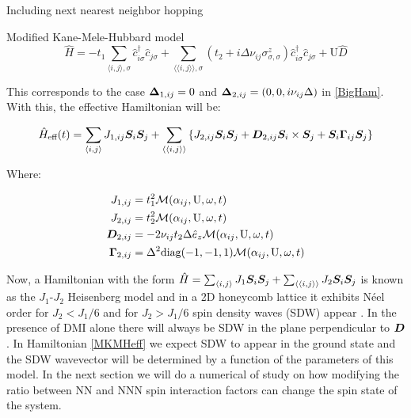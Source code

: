 \begin{section}{Including next nearest neighbor hopping}
\begin{subsection}{Modified Kane-Mele-Hubbard model}
\begin{equation}
\label{MKMH}
\hat{H} = - t_1\sum_{\langle i,j \rangle, \sigma} \hat{c}_{i \sigma}^\dagger \hat{c}_{j \sigma} + 
	\sum_{\langle \langle i,j \rangle \rangle, \sigma}(t_2 + i\Delta\nu_{ij}\sigma^z_{\sigma, \sigma})\hat{c}_{i \sigma}^\dagger \hat{c}_{j \sigma} + 
	\text{U}\hat{D}
\end{equation}

This corresponds to the case $\boldsymbol{\Delta}_{1,ij} = 0$ and $\boldsymbol{\Delta}_{2,ij} = (0, 0, i \nu_{ij} \Delta)$ in \ref{BigHam}. With this, the effective Hamiltonian will be:

\begin{equation}
\label{MKMHeff}
\hat{H}_{\text{eff}}(t) = \sum_{\langle i,j \rangle} J_{1,ij}\boldsymbol{S}_i\boldsymbol{S}_j + \sum_{\langle \langle i,j \rangle \rangle} \left\{ J_{2,ij}\boldsymbol{S}_i\boldsymbol{S}_j + \boldsymbol{D}_{2,ij} \boldsymbol{S}_i \times \boldsymbol{S}_j + \boldsymbol{S}_i \boldsymbol{\Gamma}_{ij} \boldsymbol{S}_j \right\}
\end{equation}

Where:

\begin{align*}
J_{1,ij} &= t_1^2\mathcal{M}(\alpha_{ij}, \text{U}, \omega, t) \\
J_{2,ij} &= t_2^2\mathcal{M}(\alpha_{ij}, \text{U}, \omega, t) \\
\boldsymbol{D}_{2,ij} &= - 2\nu_{ij} t_2 \Delta \hat{e}_z \mathcal{M}(\alpha_{ij}, \text{U}, \omega, t) \\
\boldsymbol{\Gamma}_{2,ij} &= \Delta^2 \text{diag}(-1,-1,1) \mathcal{M}(\alpha_{ij}, \text{U}, \omega, t) 
\end{align*}

Now, a Hamiltonian with the form $\hat{H} = \sum_{\langle i,j \rangle} J_1 \boldsymbol{S}_i\boldsymbol{S}_j + \sum_{\langle \langle i,j \rangle \rangle} J_2\boldsymbol{S}_i\boldsymbol{S}_j$ is known as the $J_1$-$J_2$ Heisenberg model and in a 2D honeycomb lattice it exhibits N\'eel order for $J_2 < J_1 / 6$ and for $J_2 > J_1 / 6$ spin density waves (SDW) appear \cite{Mulder2010}. In the presence of DMI alone there will always be SDW in the plane perpendicular to $\boldsymbol{D}$ \cite{Uchida2006}. In Hamiltonian \ref{MKMHeff} we expect SDW to appear in the ground state and the SDW wavevector will be determined by a function of the parameters of this model. In the next section we will do a numerical of study on how modifying the ratio between NN and NNN spin interaction factors can change the spin state of the system.

\end{subsection}


\end{section}
